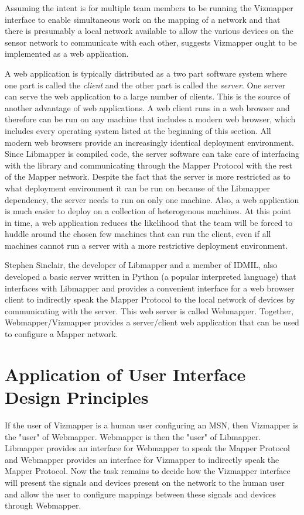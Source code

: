 Assuming the intent is for multiple team members to be running the Vizmapper interface to enable simultaneous work on the mapping of a network and that there is presumably a local network available to allow the various devices on the sensor network to communicate with each other, suggests Vizmapper ought to be implemented as a web application. 

A web application is typically distributed as a two part software system where one part is called the \emph{client} and the other part is called the \emph{server}. One server can serve the web application to a large number of clients. This is the source of another advantage of web applications. A web client runs in a web browser and therefore can be run on any machine that includes a modern web browser, which includes every operating system listed at the beginning of this section. All modern web browsers provide an increasingly identical deployment environment. Since Libmapper is compiled code, the server software can take care of interfacing with the library and communicating through the Mapper Protocol with the rest of the Mapper network. Despite the fact that the server is more restricted as to what deployment environment it can be run on because of the Libmapper dependency, the server needs to run on only one machine. Also, a web application is much easier to deploy on a collection of heterogenous machines. At this point in time, a web application reduces the likelihood that the team will be forced to huddle around the chosen few machines that can run the client, even if all machines cannot run a server with a more restrictive deployment environment.

Stephen Sinclair, the developer of Libmapper and a member of IDMIL, also developed a basic server written in Python (a popular interpreted language) that interfaces with Libmapper and provides a convenient interface for a web browser client to indirectly speak the Mapper Protocol to the local network of devices by communicating with the server. This web server is called Webmapper. Together, Webmapper/Vizmapper provides a server/client web application that can be used to configure a Mapper network.

\section{Application of User Interface Design Principles}
\label{sec:userInterface}

If the user of Vizmapper is a human user configuring an MSN, then Vizmapper is the "user" of Webmapper. Webmapper is then the "user" of Libmapper. Libmapper provides an interface for Webmapper to speak the Mapper Protocol and Webmapper provides an interface for Vizmapper to indirectly speak the Mapper Protocol. Now the task remains to decide how the Vizmapper interface will present the signals and devices present on the network to the human user and allow the user to configure mappings between these signals and devices through Webmapper.

